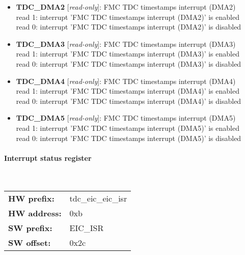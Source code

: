 \begin{itemize}
\begin{small}
\end{small}
\item \begin{small}
{\bf 
TDC\_DMA2
} [\emph{read-only}]: FMC TDC timestamps interrupt (DMA2)
\\
read 1: interrupt 'FMC TDC timestamps interrupt (DMA2)' is enabled\\read 0: interrupt 'FMC TDC timestamps interrupt (DMA2)' is disabled
\end{small}
\item \begin{small}
{\bf 
TDC\_DMA3
} [\emph{read-only}]: FMC TDC timestamps interrupt (DMA3)
\\
read 1: interrupt 'FMC TDC timestamps interrupt (DMA3)' is enabled\\read 0: interrupt 'FMC TDC timestamps interrupt (DMA3)' is disabled
\end{small}
\item \begin{small}
{\bf 
TDC\_DMA4
} [\emph{read-only}]: FMC TDC timestamps interrupt (DMA4)
\\
read 1: interrupt 'FMC TDC timestamps interrupt (DMA4)' is enabled\\read 0: interrupt 'FMC TDC timestamps interrupt (DMA4)' is disabled
\end{small}
\item \begin{small}
{\bf 
TDC\_DMA5
} [\emph{read-only}]: FMC TDC timestamps interrupt (DMA5)
\\
read 1: interrupt 'FMC TDC timestamps interrupt (DMA5)' is enabled\\read 0: interrupt 'FMC TDC timestamps interrupt (DMA5)' is disabled
\end{small}
\end{itemize}
\paragraph*{Interrupt status register}\mbox{}\\\vskip 6pt
\begin{tabular}{l l }
{\bf HW prefix:}  & tdc\_eic\_eic\_isr\\
{\bf HW address:}  & 0xb\\
{\bf SW prefix:}  & EIC\_ISR\\
{\bf SW offset:}  & 0x2c\\
\end{tabular}

